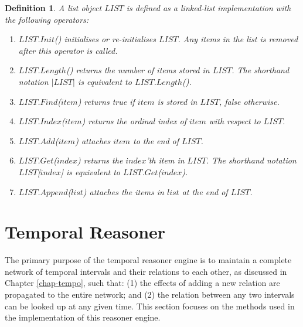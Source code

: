 \documentclass[11pt]{report}
\newtheorem{vdefinition}{Definition}[chapter]
\begin{document}
      \begin{vdefinition}
        \label{defn-impln-lists}
        A list object $LIST$ is defined as a linked-list implementation with
        the following operators:

        \begin{enumerate}
          \item
            $LIST$.$Init$() initialises or re-initialises $LIST$. Any items
            in the list is removed after this operator is called.

          \item
            $LIST$.$Length$() returns the number of items stored in $LIST$.
            The shorthand notation $|LIST|$ is equivalent to $LIST$.$Length$().

          \item
            $LIST$.$Find$($item$) returns {\em true} if $item$ is stored in
            $LIST$, {\em false} otherwise.

          \item
            $LIST$.$Index$($item$) returns the ordinal index of $item$ with
            respect to $LIST$.

          \item
            $LIST$.$Add$($item$) attaches $item$ to the end of $LIST$.

          \item
            $LIST$.$Get$($index$) returns the $index$'th item in $LIST$. The
            shorthand notation $LIST$[$index$] is equivalent to
            $LIST$.$Get$($index$).

          \item
            $LIST$.$Append$($list$) attaches the items in $list$ at the end of
            $LIST$.
        \end{enumerate}
      \end{vdefinition}

    \section{Temporal Reasoner}
      \label{sect-impln-treas}

      The primary purpose of the temporal reasoner engine is to maintain a
      complete network of temporal intervals and their relations to each
      other, as discussed in Chapter \ref{chap-tempo}, such that: (1) the
      effects of adding a new relation are propagated to the entire network;
      and (2) the relation between any two intervals can be looked up at any
      given time. This section focuses on the methods used in the
      implementation of this reasoner engine.
\end{document}
